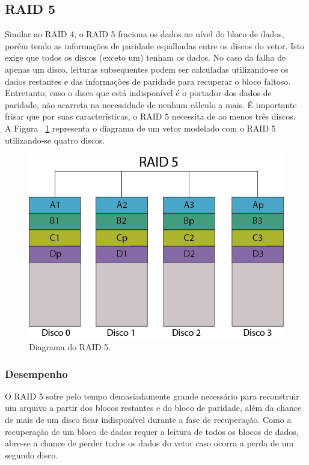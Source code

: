 \subsection{RAID 5}
Similar ao RAID 4, o RAID 5 fraciona os dados ao nível do bloco de dados, porém tendo as informações de paridade espalhadas entre os discos do vetor. Isto exige que todos os discos (exceto um) tenham os dados. No caso da falha de apenas um disco, leituras subsequentes podem ser calculadas utilizando-se os dados restantes e das informações de paridade para recuperar o bloco faltoso. Entretanto, caso o disco que está indisponível é o portador dos dados de paridade, não acarreta na necessidade de nenhum cálculo a mais. É importante frisar que por suas características, o RAID 5 necessita de ao menos três discos.  \\

A Figura ~\ref{fig:raid5} representa o diagrama de um vetor modelado com o RAID 5 utilizando-se quatro discos.\\

\begin{figure}[htb]
	\begin{center}
		
		\includegraphics[clip,scale=0.5]{images/RAID_5.png}
		\caption{Diagrama do RAID 5. }
		\label{fig:raid5}
	\end{center}
\end{figure} 

\subsubsection{Desempenho}
O RAID 5 sofre pelo tempo demasiadamente grande necessário para reconstruir um arquivo a partir dos blocos restantes e do bloco de paridade, além da chance de mais de um disco ficar indisponível durante a fase de recuperação. Como a recuperação de um bloco de dados requer a leitura de todos os blocos de dados, abre-se a chance de perder todos os dados do vetor caso ocorra a perda de um segundo disco.\\

